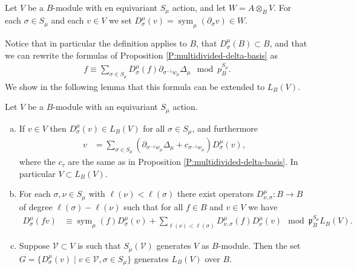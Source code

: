 \documentclass[11pt,fleqn]{article}
\newcommand\ot{\otimes}
\renewcommand\to{\longrightarrow}
\newcommand\p{\mathfrak p}
\DeclareMathOperator\sym{sym}
\begin{document}
\begin{Definition}
Let $V$ be a $B$-module with en equivariant $S_\mu$ action, and let $W = A 
\ot_B V$. For each $\sigma \in S_\mu$ and each $v \in V$ we set 
$D^\mu_\sigma(v) = \sym_\mu (\partial_\sigma v) \in W$.
\end{Definition}
Notice that in particular the definition applies to $B$, that $D^\mu_\sigma(B)
\subset B$, and that we can rewrite the formulas of Proposition 
\ref{P:multidivided-delta-basis} as 
\begin{align*}
f \equiv \sum_{\sigma \in S_\mu} D^\mu_\sigma (f) 
  \partial_{\sigma^{-1} w_\mu} \Delta_\mu \mod p^{S_\mu}_B.
\end{align*}
We show in the following lemma that this formula can be extended to $L_B(V)$.
\newcommand\W{\mathcal W}
\begin{Lemma}
\label{L:dds-generators}
Let $V$ be a $B$-module with an equivariant $S_\mu$ action. 
\begin{enumerate}[(a)]
\item 
\label{item:divided}
If $v \in V$ then $D^\mu_\sigma(v) \in L_B(V)$ for all $\sigma 
\in S_\mu$, and furthermore
\begin{align*}
v
  &=\sum_{\sigma \in S_\mu} (\partial_{\sigma^{-1}w_\mu}\Delta_\mu 
    + c_{\sigma^{-1}w_\mu}) D^\mu_\sigma(v),
\end{align*}
where the $c_\tau$ are the same as in Proposition 
\ref{P:multidivided-delta-basis}. In particular $V \subset L_B(V)$.

\item
\label{item:product-formula}
For each $\sigma, \nu \in S_\mu$ with $\ell(\nu) < \ell(\sigma)$ there exist 
operators $D_{\nu,\sigma}^\mu: B \to B$ of degree $\ell(\sigma) - \ell(\nu)$ 
such that for all $f \in B$ and $v \in V$ we have 
\begin{align*}
D^\mu_\sigma (f v)
  &\equiv \sym_\mu(f) D^\mu_\sigma(v) 
    + \sum_{\ell(\nu) < \ell(\sigma)} 
      D_{\nu,\sigma}^\mu(f)
      D^\mu_\nu (v) \mod \p_B^{S_\mu} L_B(V).
\end{align*}

\item
\label{item:generation}
Suppose $\mathcal V \subset V$ is such that $S_\mu( \mathcal V)$ generates $V$ 
as $B$-module. Then the set $G = \{D_\sigma^\mu(v) \mid v \in \mathcal V, 
\sigma \in S_\mu\}$ generates $L_B(V)$ over $B$.
\end{enumerate}
\end{Lemma}
\end{document}

